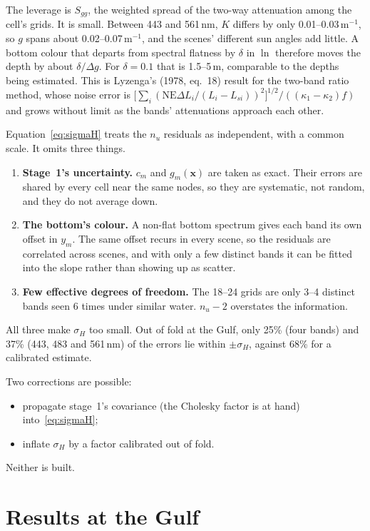 \documentclass[11pt]{article}
\numberwithin{equation}{section}
\newcommand{\bx}{\mathbf{x}}
\begin{document}
The leverage is $S_{gg}$, the weighted spread of the two-way attenuation among the cell's grids.
It is small. Between 443 and 561\,nm, $K$ differs by only 0.01--0.03\,m$^{-1}$, so $g$ spans
about 0.02--0.07\,m$^{-1}$, and the scenes' different sun angles add little. A bottom colour that
departs from spectral flatness by $\delta$ in $\ln$ therefore moves the depth by about
$\delta/\Delta g$. For $\delta = 0.1$ that is 1.5--5\,m, comparable to the depths being estimated.
This is Lyzenga's (1978, eq.~18) result for the two-band ratio method, whose noise error is
$\bigl[\sum_i (\mathrm{NE}\Delta L_i/(L_i - L_{si}))^2\bigr]^{1/2}/((\kappa_1 - \kappa_2) f)$ and grows
without limit as the bands' attenuations approach each other.

Equation~\eqref{eq:sigmaH} treats the $n_u$ residuals as independent, with a common scale. It
omits three things.
\begin{enumerate}
\item \textbf{Stage~1's uncertainty.} $c_m$ and $g_m(\bx)$ are taken as exact. Their errors are
  shared by every cell near the same nodes, so they are systematic, not random, and they do not
  average down.
\item \textbf{The bottom's colour.} A non-flat bottom spectrum gives each band its own offset in
  $y_m$. The same offset recurs in every scene, so the residuals are correlated across scenes,
  and with only a few distinct bands it can be fitted into the slope rather than showing up as
  scatter.
\item \textbf{Few effective degrees of freedom.} The 18--24 grids are only 3--4 distinct bands
  seen 6 times under similar water. $n_u - 2$ overstates the information.
\end{enumerate}
All three make $\sigma_H$ too small. Out of fold at the Gulf, only 25\% (four bands) and 37\%
(443, 483 and 561\,nm) of the errors lie within $\pm\sigma_H$, against 68\% for a calibrated
estimate.

Two corrections are possible:
\begin{itemize}
\item propagate stage~1's covariance (the Cholesky factor is at hand) into~\eqref{eq:sigmaH};
\item inflate $\sigma_H$ by a factor calibrated out of fold.
\end{itemize}
Neither is built.

\section{Results at the Gulf}
\label{sec:results}
\end{document}

